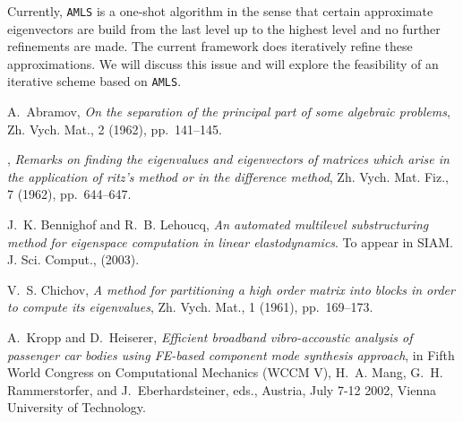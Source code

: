 \documentclass{report}
\begin{document}
Currently, {\tt AMLS} is a one-shot algorithm in the sense that certain
approximate eigenvectors are build from the last level up to the highest
level and no further refinements are made. The current framework does
iteratively refine these approximations. We will
discuss this issue and will explore the feasibility of an iterative
scheme based on {\tt AMLS}.



\begin{thebibliography}{10}

{\sc A.~Abramov}, {\em On the separation of the principal part of some
algebraic problems}, Zh. Vych. Mat., 2 (1962), pp.~141--145.

\leavevmode\vrule height 2pt depth -1.6pt width 23pt, {\em Remarks on
finding the eigenvalues and eigenvectors of matrices which arise in the
application of ritz's method or in the difference method}, Zh. Vych. Mat.
Fiz., 7 (1962), pp.~644--647.

{\sc J.~K. Bennighof and R.~B. Lehoucq}, {\em An automated multilevel
substructuring method for eigenspace computation in linear
elastodynamics}. To appear in SIAM. J. Sci. Comput., (2003).

 {\sc V.~S. Chichov}, {\em A method for partitioning a
high order matrix into blocks in order to compute its eigenvalues}, Zh.
Vych. Mat., 1 (1961), pp.~169--173.


{\sc A.~Kropp and D.~Heiserer}, {\em Efficient broadband vibro-accoustic
analysis of passenger car bodies using {FE}-based component mode
synthesis approach}, in Fifth World Congress on Computational Mechanics
(WCCM V), H.~A. Mang, G.~H. Rammerstorfer, and J.~Eberhardsteiner, eds.,
Austria, July 7-12
2002, Vienna University of Technology.




\end{thebibliography}
\end{document}

